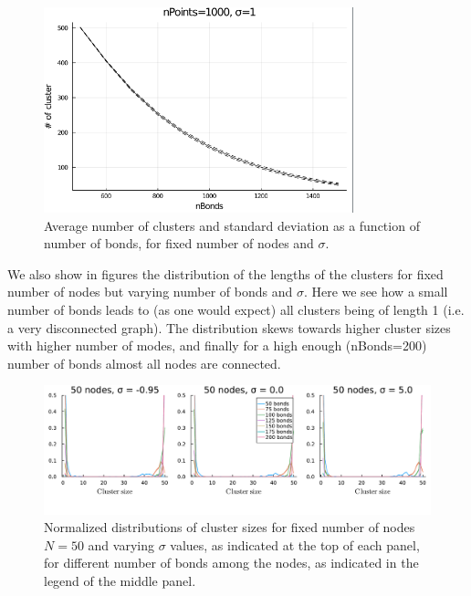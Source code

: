 \begin{figure}[t]
	\centering
	\includegraphics[width=0.8\textwidth]{figures/nClusters.png}
	\caption{Average number of clusters and standard deviation as a function of number of bonds, for fixed number of nodes and $\sigma$. }
	\label{fig:nClusters}
\end{figure}

We also show in figures  the distribution of the lengths of the clusters for fixed number of nodes but varying number of bonds and  $\sigma.$ Here we see how a small number of bonds leads to (as one would expect) all clusters being of length 1 (i.e. a very disconnected graph). The distribution skews towards higher cluster sizes with higher number of modes, and finally for a high enough (nBonds=200) number of bonds almost all nodes are connected.

\begin{figure}
		\centering
		\includegraphics[width=\textwidth]{figures/clusterSizeDistribution.pdf}
	\caption{Normalized distributions of cluster sizes for fixed number of nodes $N=50$ and  varying $\sigma$ values, as indicated at the top of each panel, for different number of bonds among the nodes, as indicated in the legend of the middle panel.}
	\label{fig:clusterLengthDistributionsigma2}
\end{figure}


